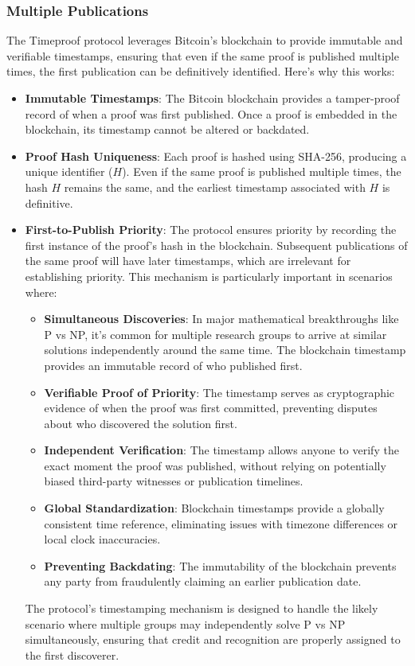 \documentclass[12pt]{report}
\begin{document}
\subsubsection{Multiple Publications}
The Timeproof protocol leverages Bitcoin's blockchain to provide immutable and verifiable timestamps, ensuring that even if the same proof is published multiple times, the first publication can be definitively identified. Here's why this works:

\begin{itemize}
    \item \textbf{Immutable Timestamps}: The Bitcoin blockchain provides a tamper-proof record of when a proof was first published. Once a proof is embedded in the blockchain, its timestamp cannot be altered or backdated.
    \item \textbf{Proof Hash Uniqueness}: Each proof is hashed using SHA-256, producing a unique identifier (\( H \)). Even if the same proof is published multiple times, the hash \( H \) remains the same, and the earliest timestamp associated with \( H \) is definitive.
    \item \textbf{First-to-Publish Priority}: The protocol ensures priority by recording the first instance of the proof's hash in the blockchain. Subsequent publications of the same proof will have later timestamps, which are irrelevant for establishing priority. This mechanism is particularly important in scenarios where:
    \begin{itemize}
        \item \textbf{Simultaneous Discoveries}: In major mathematical breakthroughs like P vs NP, it's common for multiple research groups to arrive at similar solutions independently around the same time. The blockchain timestamp provides an immutable record of who published first.
        \item \textbf{Verifiable Proof of Priority}: The timestamp serves as cryptographic evidence of when the proof was first committed, preventing disputes about who discovered the solution first.
        \item \textbf{Independent Verification}: The timestamp allows anyone to verify the exact moment the proof was published, without relying on potentially biased third-party witnesses or publication timelines.
        \item \textbf{Global Standardization}: Blockchain timestamps provide a globally consistent time reference, eliminating issues with timezone differences or local clock inaccuracies.
        \item \textbf{Preventing Backdating}: The immutability of the blockchain prevents any party from fraudulently claiming an earlier publication date.
    \end{itemize}
    The protocol's timestamping mechanism is designed to handle the likely scenario where multiple groups may independently solve P vs NP simultaneously, ensuring that credit and recognition are properly assigned to the first discoverer.
\end{itemize}
\end{document}
